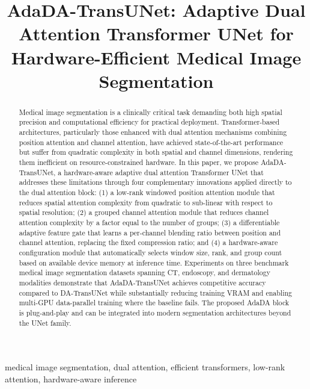 \documentclass[conference]{IEEEtran}
\begin{document}
\title{AdaDA-TransUNet: Adaptive Dual Attention Transformer UNet for Hardware-Efficient Medical Image Segmentation}

\author{
}

\maketitle

\begin{abstract}
Medical image segmentation is a clinically critical task demanding both high spatial precision and computational efficiency for practical deployment. Transformer-based architectures, particularly those enhanced with dual attention mechanisms combining position attention and channel attention, have achieved state-of-the-art performance but suffer from quadratic complexity in both spatial and channel dimensions, rendering them inefficient on resource-constrained hardware. In this paper, we propose AdaDA-TransUNet, a hardware-aware adaptive dual attention Transformer UNet that addresses these limitations through four complementary innovations applied directly to the dual attention block: (1) a low-rank windowed position attention module that reduces spatial attention complexity from quadratic to sub-linear with respect to spatial resolution; (2) a grouped channel attention module that reduces channel attention complexity by a factor equal to the number of groups; (3) a differentiable adaptive feature gate that learns a per-channel blending ratio between position and channel attention, replacing the fixed compression ratio; and (4) a hardware-aware configuration module that automatically selects window size, rank, and group count based on available device memory at inference time. Experiments on three benchmark medical image segmentation datasets spanning CT, endoscopy, and dermatology modalities demonstrate that AdaDA-TransUNet achieves competitive accuracy compared to DA-TransUNet while substantially reducing training VRAM and enabling multi-GPU data-parallel training where the baseline fails. The proposed AdaDA block is plug-and-play and can be integrated into modern segmentation architectures beyond the UNet family.
\end{abstract}

\begin{IEEEkeywords}
medical image segmentation, dual attention, efficient transformers, low-rank attention, hardware-aware inference
\end{IEEEkeywords}
\end{document}
